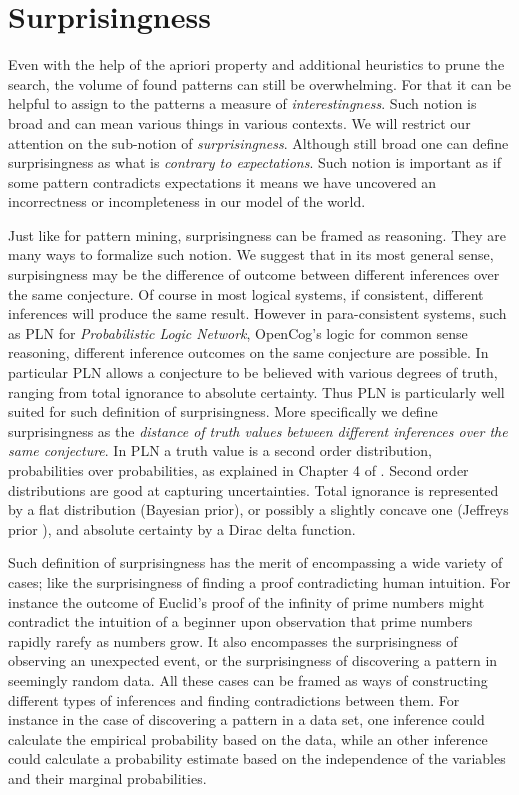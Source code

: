 \documentclass[runningheads]{llncs}
\begin{document}
\section{Surprisingness}

Even with the help of the apriori property and additional heuristics
to prune the search, the volume of found patterns can still be
overwhelming. For that it can be helpful to assign to the patterns a
measure of \emph{interestingness}. Such notion is broad and can mean
various things in various contexts. We will restrict our attention on
the sub-notion of \emph{surprisingness}. Although still broad one can
define surprisingness as what is \emph{contrary to expectations}. Such
notion is important as if some pattern contradicts expectations it
means we have uncovered an incorrectness or incompleteness in our
model of the world.

Just like for pattern mining, surprisingness can be framed as
reasoning. They are many ways to formalize such notion. We suggest
that in its most general sense, surpisingness may be the difference of
outcome between different inferences over the same conjecture. Of
course in most logical systems, if consistent, different inferences
will produce the same result. However in para-consistent systems, such
as PLN \cite{Goertzel2009PLN} for \emph{Probabilistic Logic Network},
OpenCog's logic for common sense reasoning, different inference
outcomes on the same conjecture are possible. In particular PLN allows
a conjecture to be believed with various degrees of truth, ranging
from total ignorance to absolute certainty. Thus PLN is particularly
well suited for such definition of surprisingness. More specifically
we define surprisingness as the \emph{distance of truth values between
  different inferences over the same conjecture}. In PLN a truth value
is a second order distribution, probabilities over probabilities, as
explained in Chapter 4 of \cite{Goertzel2009PLN}. Second order
distributions are good at capturing uncertainties. Total ignorance is
represented by a flat distribution (Bayesian prior), or possibly a
slightly concave one (Jeffreys prior \cite{Jeffreys46Invariant}), and
absolute certainty by a Dirac delta function.

Such definition of surprisingness has the merit of encompassing a wide
variety of cases; like the surprisingness of finding a proof
contradicting human intuition. For instance the outcome of Euclid's
proof of the infinity of prime numbers might contradict the intuition
of a beginner upon observation that prime numbers rapidly rarefy as
numbers grow. It also encompasses the surprisingness of observing an
unexpected event, or the surprisingness of discovering a pattern in
seemingly random data. All these cases can be framed as ways of
constructing different types of inferences and finding contradictions
between them. For instance in the case of discovering a pattern in a
data set, one inference could calculate the empirical probability
based on the data, while an other inference could calculate a
probability estimate based on the independence of the variables and
their marginal probabilities.
\end{document}
